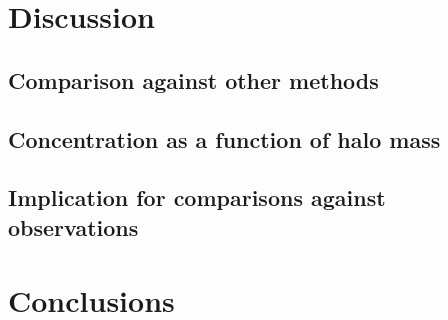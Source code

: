 \documentclass[useAMS,usenatbib]{mn2e}
\begin{document}
\section{Discussion}
\label{sec:discussion}

\subsection{Comparison against other methods}

\subsection{Concentration as a function of halo mass}

\subsection{Implication for comparisons against observations}


\section{Conclusions}
\label{sec:conclusions}




\end{document}
